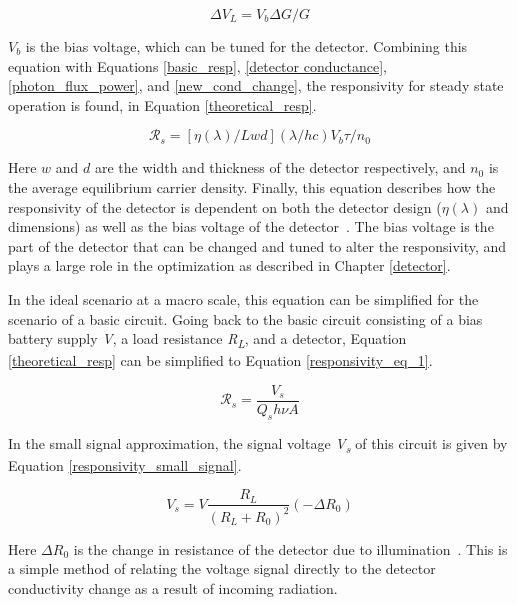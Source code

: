 \begin{equation}\label{signal_V}
    \Delta V_L = V_b \Delta G/G
\end{equation}

$V_b$ is the bias voltage, which can be tuned for the detector. Combining this equation with Equations \ref{basic_resp}, \ref{detector conductance}, \ref{photon_flux_power}, and \ref{new_cond_change}, the responsivity for steady state operation is found, in Equation \ref{theoretical_resp}.

\begin{equation}\label{theoretical_resp}
    \mathcal{R}_s = [\eta(\lambda)/Lwd](\lambda/hc)V_b \tau / n_0
\end{equation}

Here $w$ and $d$ are the width and thickness of the detector respectively, and $n_0$ is the average equilibrium carrier density. Finally, this equation describes how the responsivity of the detector is dependent on both the detector design ($\eta(\lambda)$ and dimensions) as well as the bias voltage of the detector~\citep{mct_detector_text_old}. The bias voltage is the part of the detector that can be changed and tuned to alter the responsivity, and plays a large role in the optimization as described in Chapter \ref{detector}.

In the ideal scenario at a macro scale, this equation can be simplified for the scenario of a basic circuit. Going back to the basic circuit consisting of a bias battery supply \textit{V}, a load resistance \textit{R\textsubscript{L}}, and a detector, Equation \ref{theoretical_resp} can be simplified to Equation \ref{responsivity_eq_1}.

\begin{equation} \label{responsivity_eq_1}
    \mathcal{R}_s = \frac{V_s}{Q_s h \nu A}
\end{equation}

In the small signal approximation, the signal voltage \textit{V\textsubscript{s}} of this circuit is given by Equation \ref{responsivity_small_signal}.

\begin{equation} \label{responsivity_small_signal}
    V_s = V \frac{R_L}{(R_L+R_0)^2}(-\Delta R_0)
\end{equation}

Here $\Delta R_0$ is the change in resistance of the detector due to illumination~\citep{MCT_responsivity}. This is a simple method of relating the voltage signal directly to the detector conductivity change as a result of incoming radiation.

